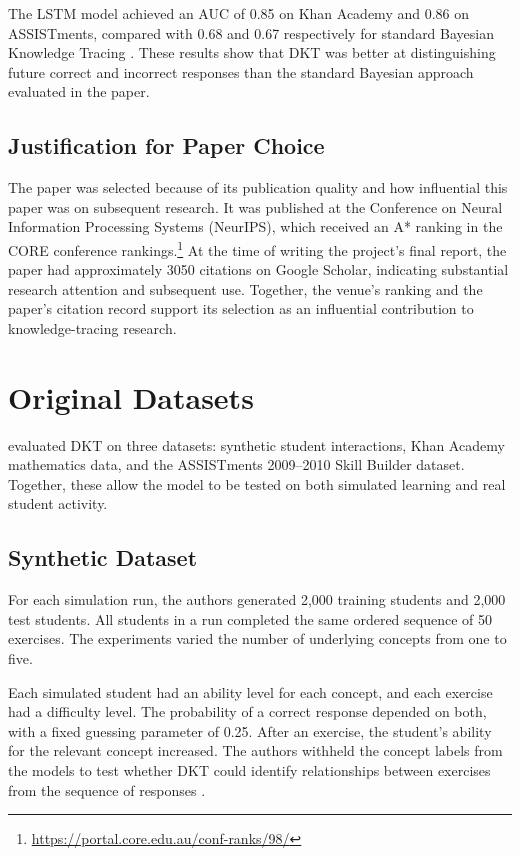 \documentclass[11pt]{article}
\begin{document}
The LSTM model achieved an AUC of 0.85 on Khan Academy and 0.86 on ASSISTments, compared with 0.68 and 0.67 respectively for standard Bayesian Knowledge Tracing \citep{piech2015deep}. These results show that DKT was better at distinguishing future correct and incorrect responses than the standard Bayesian approach evaluated in the paper.
\subsection{Justification for Paper Choice}

The paper was selected because of its publication quality and how influential this paper was on subsequent research. It was published at the Conference on Neural Information Processing Systems (NeurIPS), which received an A* ranking in the CORE conference rankings.\footnote{\url{https://portal.core.edu.au/conf-ranks/98/}} At the time of writing the project's final report, the paper had approximately 3050 citations on Google Scholar, indicating substantial research attention and subsequent use. Together, the venue's ranking and the paper's citation record support its selection as an influential contribution to knowledge-tracing research.


\section{Original Datasets}

\citet{piech2015deep} evaluated DKT on three datasets: synthetic student interactions, Khan Academy mathematics data, and the ASSISTments 2009--2010 Skill Builder dataset. Together, these allow the model to be tested on both simulated learning and real student activity.

\subsection{Synthetic Dataset}

For each simulation run, the authors generated 2,000 training students
and 2,000 test students. All students in a run completed the same
ordered sequence of 50 exercises. The experiments varied the number
of underlying concepts from one to five.

Each simulated student had an ability level for each concept, and each
exercise had a difficulty level. The probability of a correct response
depended on both, with a fixed guessing parameter of 0.25. After an
exercise, the student's ability for the relevant concept increased.
The authors withheld the concept labels from the models to test whether
DKT could identify relationships between exercises from the sequence
of responses \citep{piech2015deep}.
\end{document}
